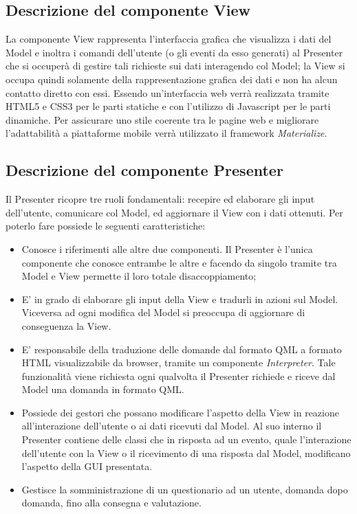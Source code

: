 \rigaregistro{0.0.17}{Luca Alessio (Progettista)}{12/05/2016}{Termine stesura sezione diagrammi e revisione/ampliamento di vari paragrafi}\documentclass[a4paper,11pt]{article}
\begin{document}
	\subsection{Descrizione del componente View}
	La componente View rappresenta l'interfaccia grafica che visualizza i dati del Model e inoltra i comandi dell'utente (o gli eventi da esso generati) al Presenter che si occuperà di gestire tali richieste sui dati interagendo col Model; la View si occupa quindi solamente della rappresentazione grafica dei dati e non ha alcun contatto diretto con essi. Essendo un'interfaccia web verrà realizzata tramite HTML5 e CSS3 per le parti statiche e con l'utilizzo di Javascript per le parti dinamiche. Per assicurare uno stile coerente tra le pagine web e migliorare l'adattabilità a piattaforme mobile verrà utilizzato il framework \emph{Materialize}.
	\subsection{Descrizione del componente Presenter}
	Il Presenter ricopre tre ruoli fondamentali: recepire ed elaborare gli input dell'utente,
comunicare col Model, ed aggiornare il View con i dati ottenuti. Per poterlo fare possiede le seguenti caratteristiche:
	\begin{itemize}
		\item Conosce i riferimenti alle altre due componenti. Il Presenter è l'unica componente che conosce entrambe le altre e facendo da singolo tramite tra Model e View permette il loro totale disaccoppiamento;
		\item E' in grado di elaborare gli input della View e tradurli in azioni sul Model. Viceversa ad ogni modifica del Model si preoccupa di aggiornare di conseguenza la View.  
		\item E' responsabile della traduzione delle domande dal formato QML a formato HTML visualizzabile da browser, tramite un componente \emph{Interpreter}.  Tale funzionalità viene richiesta ogni qualvolta il Presenter richiede e riceve dal Model una domanda in formato QML.
		\item Possiede dei gestori che possano modificare l'aspetto della View in reazione all'interazione dell'utente o ai dati ricevuti dal Model. Al suo interno il Presenter contiene delle classi che in risposta ad un evento, quale l'interazione dell'utente con la View o il ricevimento di una risposta dal Model, modificano l'aspetto della GUI presentata.
		\item Gestisce la somministrazione di un questionario ad un utente, domanda dopo domanda, fino alla consegna e valutazione.
	\end{itemize}
	\newpage
\end{document}
